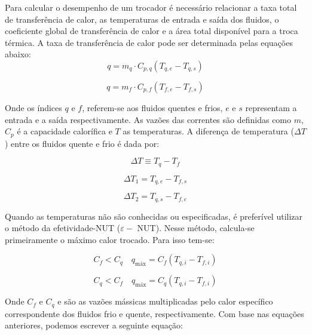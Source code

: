 Para calcular o desempenho de um trocador é necessário relacionar a taxa total de transferência de calor, as temperaturas de entrada e saída dos fluidos, o coeficiente global de transferência de calor e a área total disponível para a troca térmica. A taxa de transferência de calor pode ser determinada pelas equações abaixo:
\\
\begin{equation}
	q = m_q \cdot C_{p,q} (T_{q,e} - T_{q,s})
\end{equation}

\begin{equation}
	q = m_f \cdot C_{p,f} (T_{f,e} - T_{f,s})
\end{equation}

Onde os índices \(q \) e \(f\), referem-se aos fluidos quentes e frios, \(e\) e \(s\) representam a entrada e a saída respectivamente. As vazões das correntes são definidas como \(m\), \(C_p\) é a capacidade calorífica e \(T\) as temperaturas.
A diferença de temperatura (\(\Delta T\)) entre os fluidos quente e frio é dada por:

\begin{equation}
	\Delta T \equiv T_q - T_f
\end{equation}

\begin{equation}
	\Delta T_1 = T_{q,e} - T_{f,s}
\end{equation}

\begin{equation}
	\Delta T_2 = T_{q,s} - T_{f,e}
\end{equation}

Quando as temperaturas não são conhecidas ou especificadas, é preferível utilizar o método da efetividade-NUT ($\varepsilon -$  NUT). Nesse método, calcula-se primeiramente o máximo calor trocado. Para isso tem-se:


\begin{equation}
	C_f < C_q \quad q_{\text{máx}} = C_f (T_{q,i} - T_{f,i})
\end{equation}

\begin{equation}
	C_q < C_f \quad q_{\text{máx}} = C_q (T_{q,i} - T_{f,i})
\end{equation}


Onde \(C_f\) e \(C_q\) e são as vazões mássicas multiplicadas pelo calor específico correspondente dos fluidos frio e quente, respectivamente.
Com base nas equações anteriores, podemos escrever a seguinte equação:


